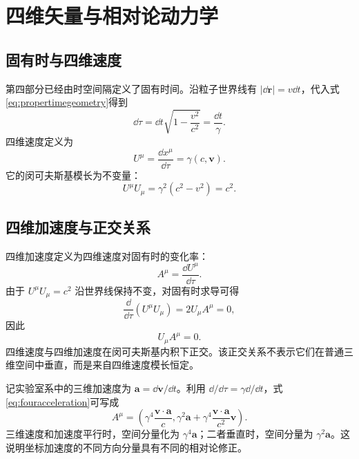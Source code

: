 \documentclass[style=classic,color=full]{lc-article}
\begin{document}
\section{四维矢量与相对论动力学}

\subsection{固有时与四维速度}

第四部分已经由时空间隔定义了固有时间。沿粒子世界线有
$\lvert\dd\bm r\rvert=v\dd t$，代入式\eqref{eq:propertimegeometry}得到
\begin{equation}
  \dd\tau=\dd t\sqrt{1-\frac{v^2}{c^2}}=\frac{\dd t}{\gamma}.
\end{equation}
四维速度定义为
\begin{equation}
  U^\mu=\frac{\dd x^\mu}{\dd\tau}
  =\gamma(c,\bm v).
\end{equation}
它的闵可夫斯基模长为不变量：
\begin{equation}
  U^\mu U_\mu=\gamma^2(c^2-v^2)=c^2.
\end{equation}

\subsection{四维加速度与正交关系}

四维加速度定义为四维速度对固有时的变化率：
\begin{equation}
  A^\mu=\frac{\dd U^\mu}{\dd\tau}.
  \label{eq:fouracceleration}
\end{equation}
由于 $U^\mu U_\mu=c^2$ 沿世界线保持不变，对固有时求导可得
\begin{equation}
  \frac{\dd}{\dd\tau}(U^\mu U_\mu)
  =2U_\mu A^\mu=0,
\end{equation}
因此
\begin{equation}
  \boxed{U_\mu A^\mu=0.}
  \label{eq:velocityaccelerationorthogonal}
\end{equation}
四维速度与四维加速度在闵可夫斯基内积下正交。该正交关系不表示它们在普通三维空间中垂直，而是来自四维速度模长恒定。

记实验室系中的三维加速度为 $\bm a=\dd\bm v/\dd t$。利用 $\dd/\dd\tau=\gamma\dd/\dd t$，式\eqref{eq:fouracceleration}可写成
\begin{equation}
  A^\mu=\left(
    \gamma^4\frac{\bm v\mathbin{\cdot}\bm a}{c},
    \gamma^2\bm a
    +\gamma^4\frac{\bm v\mathbin{\cdot}\bm a}{c^2}\bm v
  \right).
  \label{eq:fouraccelerationcomponents}
\end{equation}
三维速度和加速度平行时，空间分量化为 $\gamma^4\bm a$；二者垂直时，空间分量为 $\gamma^2\bm a$。这说明坐标加速度的不同方向分量具有不同的相对论修正。
\end{document}
